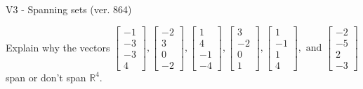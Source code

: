 \begin{exercise}
  \begin{exerciseTitle}V3 - Spanning sets (ver. 864)\end{exerciseTitle}
  \begin{exerciseStatement}
    Explain why the vectors \(\left[\begin{array}{r}
-1 \\
-3 \\
-3 \\
4
\end{array}\right] , \left[\begin{array}{r}
-2 \\
3 \\
0 \\
-2
\end{array}\right] , \left[\begin{array}{r}
1 \\
4 \\
-1 \\
-4
\end{array}\right] , \left[\begin{array}{r}
3 \\
-2 \\
0 \\
1
\end{array}\right] , \left[\begin{array}{r}
1 \\
-1 \\
1 \\
4
\end{array}\right] , \text{ and } \left[\begin{array}{r}
-2 \\
-5 \\
2 \\
-3
\end{array}\right]\) span or don't span \(\mathbb{R}^4\). 
	



\end{exerciseStatement}
\end{exercise}
